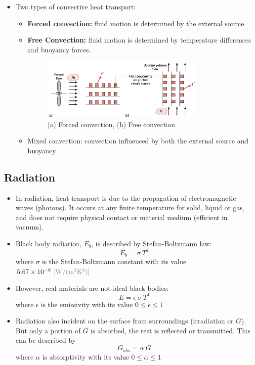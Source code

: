 \documentclass[12pt, a4paper]{article}
\numberwithin{equation}{subsection}
\begin{document}
\begin{itemize}
    \item Two types of convective heat transport:
    \begin{itemize}
        \item \textbf{Forced convection:} fluid motion is determined by the external source.
        \item \textbf{Free Convection:} fluid motion is determined by temperature differences and buoyancy forces.
    \begin{figure}[H]
        \centering
        \includegraphics[width = 0.8\textwidth]{img/forced_and_free_convection.eps}
        \caption{(a) Forced convection, (b) Free convection}
    \end{figure}

    \item Mixed convection: convection influenced by both the external source and buoyancy
    \end{itemize}
\end{itemize}
 
\subsection{Radiation}
\begin{itemize}
    \item In radiation, heat transport is due to the propagation of electromagnetic waves (photons). It occurs at any finite temperature for solid, liquid or gas, and does not require physical contact or material medium (efficient in vacuum).
    
    \item Black body radiation, $E_{b}$, is described by Stefan-Boltzmann law: 
    \[ E_{b} = \sigma \ T^{4} \] 
    where $\sigma$ is the Stefan-Boltzmann constant with its value $ 5.67\times10^{-8} \ {\color{gray} [\mathrm{W/(m^{2} K^{4})}]}$

    \item However, real materials are not ideal black bodies:  \[ E = \epsilon \ \sigma \ T^{4} \] where $\epsilon$ is the emissivity with its value $0 \leq \epsilon \leq 1$

    \item Radiation also incident on the surface from surroundings (irradiation or $G$). But only a portion of $G$ is absorbed, the rest is reflected or transmitted. This can be described by \[ G_{abs} = \alpha  \ G \] where $\alpha$ is absorptivity with its value $0 \leq \alpha \leq 1$
\end{itemize}
\newpage
\end{document}

